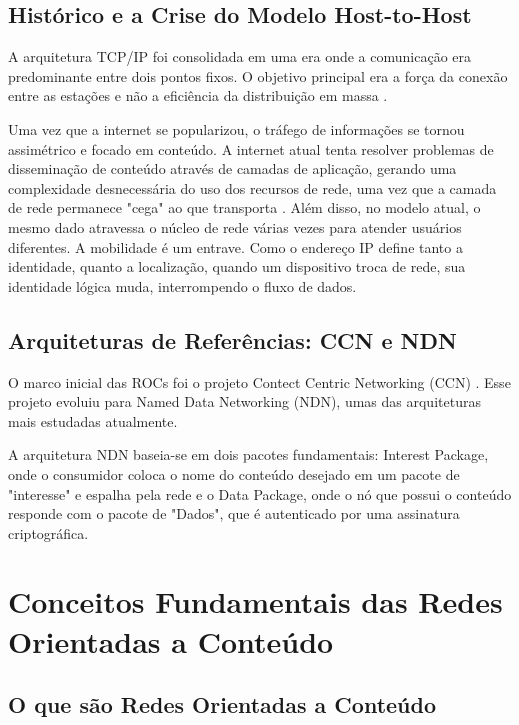 \documentclass[12pt]{article}
\begin{document}
\subsection{Histórico e a Crise do Modelo Host-to-Host}

A arquitetura TCP/IP foi consolidada em uma era onde a comunicação era predominante entre dois pontos fixos. O objetivo principal era a força da conexão entre as estações e não a eficiência da distribuição em massa \cite{clark1988design}.

Uma vez que a internet se popularizou, o tráfego de informações se tornou assimétrico e focado em conteúdo. A internet atual tenta resolver problemas de disseminação de conteúdo através de camadas de aplicação, gerando uma complexidade desnecessária do uso dos recursos de rede, uma vez que a camada de rede permanece "cega" ao que transporta \cite{ahlgren2012survey}. Além disso, no modelo atual, o mesmo dado atravessa o núcleo de rede várias vezes para atender usuários diferentes. A mobilidade é um entrave. Como o endereço IP define tanto a identidade, quanto a localização, quando um dispositivo troca de rede, sua identidade lógica muda, interrompendo o fluxo de dados.

\subsection{Arquiteturas de Referências: CCN e NDN}

O marco inicial das ROCs foi o projeto Contect Centric Networking (CCN) \cite{jacobson2009networking}. Esse projeto evoluiu para Named Data Networking (NDN), umas das arquiteturas mais estudadas atualmente.

A arquitetura NDN baseia-se em dois pacotes fundamentais: Interest Package, onde o consumidor coloca o nome do conteúdo desejado em um pacote de "interesse" e espalha pela rede e o Data Package, onde o nó que possui o conteúdo responde com o pacote de "Dados", que é autenticado por uma assinatura criptográfica.

\section{Conceitos Fundamentais das Redes Orientadas a Conteúdo}

\subsection{O que são Redes Orientadas a Conteúdo}
\end{document}
